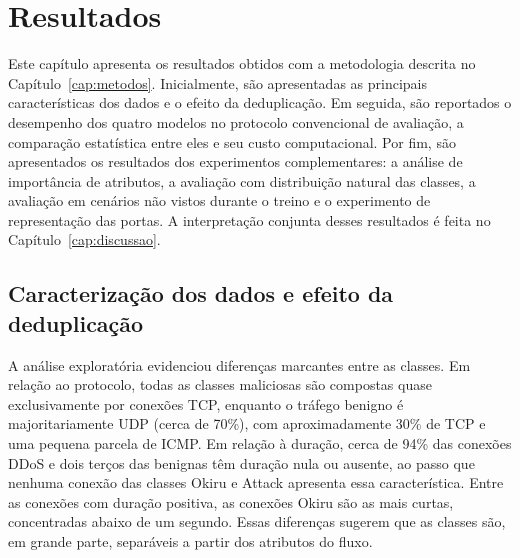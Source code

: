 
\chapter{Resultados}
\label{cap:resultados}

Este capítulo apresenta os resultados obtidos com a metodologia descrita no Capítulo~\ref{cap:metodos}. Inicialmente, são apresentadas as principais características dos dados e o efeito da deduplicação. Em seguida, são reportados o desempenho dos quatro modelos no protocolo convencional de avaliação, a comparação estatística entre eles e seu custo computacional. Por fim, são apresentados os resultados dos experimentos complementares: a análise de importância de atributos, a avaliação com distribuição natural das classes, a avaliação em cenários não vistos durante o treino e o experimento de representação das portas. A interpretação conjunta desses resultados é feita no Capítulo~\ref{cap:discussao}.

\section{Caracterização dos dados e efeito da deduplicação}
\label{sec:res-dados}

A análise exploratória evidenciou diferenças marcantes entre as classes. Em relação ao protocolo, todas as classes maliciosas são compostas quase exclusivamente por conexões TCP, enquanto o tráfego benigno é majoritariamente UDP (cerca de 70\%), com aproximadamente 30\% de TCP e uma pequena parcela de ICMP. Em relação à duração, cerca de 94\% das conexões DDoS e dois terços das benignas têm duração nula ou ausente, ao passo que nenhuma conexão das classes Okiru e Attack apresenta essa característica. Entre as conexões com duração positiva, as conexões Okiru são as mais curtas, concentradas abaixo de um segundo. Essas diferenças sugerem que as classes são, em grande parte, separáveis a partir dos atributos do fluxo.

